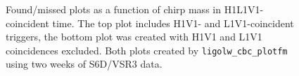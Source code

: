 \begin{figure}[p]
\center
{}
\label{fig:V1doubles-found_missed}
\caption{Found/missed plots as a function of chirp mass in H1L1V1-coincident
time. The top plot includes H1V1- and L1V1-coincident triggers, the bottom plot
was created with H1V1 and L1V1 coincidences excluded. Both plots created by
\texttt{ligolw\_cbc\_plotfm} using two weeks of S6D/VSR3 data.}
\end{figure}

